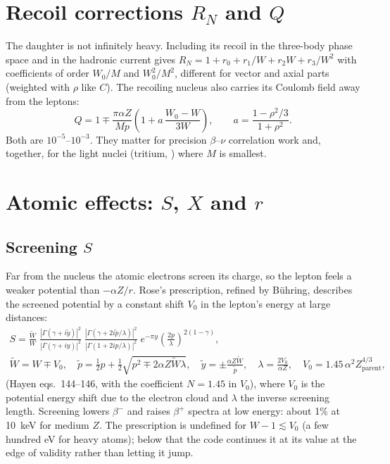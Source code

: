 \section{Recoil corrections $R_N$ and $Q$}
The daughter is not infinitely heavy. Including its recoil in the three-body phase space and in the hadronic current gives $R_N = 1 + r_0 + r_1/W + r_2 W + r_3/W^2$ with coefficients of order $W_0/M$ and $W_0^2/M^2$, different for vector and axial parts (weighted with $\rho$ like $C$). The recoiling nucleus also carries its Coulomb field away from the leptons:
\begin{equation}
Q = 1 \mp \frac{\pi\alpha Z}{M p}\left(1 + a\,\frac{W_0-W}{3W}\right), \qquad a = \frac{1-\rho^2/3}{1+\rho^2}.
\end{equation}
Both are $10^{-5}$--$10^{-3}$. They matter for precision $\beta$--$\nu$ correlation work and, together, for the light nuclei (tritium, ) where $M$ is smallest.

\section{Atomic effects: $S$, $X$ and $r$}
\subsection{Screening $S$}
Far from the nucleus the atomic electrons screen its charge, so the lepton feels a weaker potential than $-\alpha Z/r$. Rose's prescription, refined by Bühring, describes the screened potential by a constant shift $V_0$ in the lepton's energy at large distances:
\begin{gather}
S = \frac{\tilde W}{W}\;
\frac{|\Gamma(\gamma + i\tilde y)|^2}{|\Gamma(\gamma + iy)|^2}\;
\frac{|\Gamma(\gamma + 2i\tilde p/\lambda)|^2}{|\Gamma(1 + 2ip/\lambda)|^2}\;
e^{-\pi y}\left(\frac{2p}{\lambda}\right)^{2(1-\gamma)},\\
\tilde W = W \mp V_0,\quad \tilde p = \tfrac12 p + \tfrac12\sqrt{p^2 \mp 2\alpha Z\tilde W\lambda},\quad
\tilde y = \pm\frac{\alpha Z\tilde W}{\tilde p},\quad \lambda = \frac{2V_0}{\alpha Z},\quad V_0 = 1.45\,\alpha^2 Z_\text{parent}^{4/3},\nonumber
\end{gather}
(Hayen eqs.\ 144--146, with the coefficient $N = 1.45$ in $V_0$), where $V_0$ is the potential energy shift due to the electron cloud and $\lambda$ the inverse screening length. Screening lowers $\beta^-$ and raises $\beta^+$ spectra at low energy: about 1\% at \SI{10}{keV} for medium $Z$. The prescription is undefined for $W - 1 \lesssim V_0$ (a few hundred eV for heavy atoms); below that the code continues it at its value at the edge of validity rather than letting it jump.

